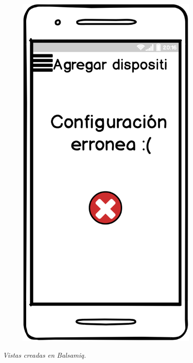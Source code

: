 \begin{figure}[H]
\begin{subfigure}[b]{0.20\textwidth}
    \label{fig:balsamiq}
  \end{subfigure}
  \begin{subfigure}[b]{0.20\textwidth}
    \includegraphics[width=\textwidth, keepaspectratio]{images/balsamiq11}
    \label{fig:balsamiq}
  \end{subfigure}
\caption{\textit{Vistas creadas en Balsamiq.}}
\end{figure}


